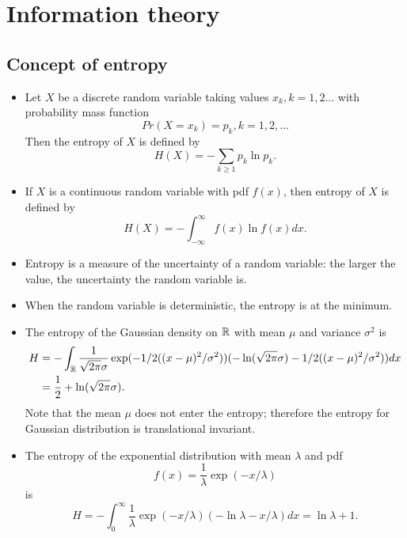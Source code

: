 \begin{refsection}
\begin{remark}[interpretation]
\end{remark}


\section{Information theory}\label{ch:theory-of-probability:sec:informationTheory}


\subsection{Concept of entropy}

\begin{definition}\hfill
	\begin{itemize}
		\item 	Let $X$ be a discrete random variable taking values $x_k,k=1,2...$ with probability mass function 
		$$Pr(X = x_k) = p_k, k=1,2,...$$ 
		Then the entropy of $X$ is defined by
		$$H(X) = - \sum_{k\geq 1}p_k\ln p_k.$$
		\item If $X$ is a continuous random variable with pdf $f(x)$, then entropy of $X$ is defined by
		$$H(X) = -\int_{-\infty}^{\infty} f(x)\ln f(x) dx.$$
	\end{itemize}	
	
\end{definition}

\begin{remark}\hfill
	\begin{itemize}
		\item Entropy is a measure of the uncertainty of a random variable: the larger the value, the uncertainty the random variable is.
		\item When the random variable is deterministic, the entropy is at the minimum.
	\end{itemize}	
\end{remark}


\begin{example}\hfill
	\begin{itemize}
		\item The entropy of the Gaussian density on $\mathbb{R}$ with mean $\mu$ and variance $\sigma^2$ is
		\begin{align*}
		H &= -\int_{\mathbb{R}} \frac{1}{\sqrt{2\pi}\sigma} \exp(-1/2((x-\mu)^2/\sigma^2))(-\ln(\sqrt{2\pi}\sigma) -1/2((x-\mu)^2/\sigma^2))dx \\
		&= \frac{1}{2} + \ln(\sqrt{2\pi}\sigma).
		\end{align*}
		Note that the mean $\mu$ does not enter the entropy; therefore the entropy for Gaussian distribution is translational invariant.
		\item The entropy of the exponential distribution with mean $\lambda$ and pdf
		$$f(x) = \frac{1}{\lambda}\exp(-x/\lambda)$$
		is
		$$H = -\int_0^\infty \frac{1}{\lambda} \exp(-x/\lambda)(-\ln \lambda -x/\lambda) dx = \ln \lambda + 1.$$
	\end{itemize}	
\end{example}




\end{refsection}
